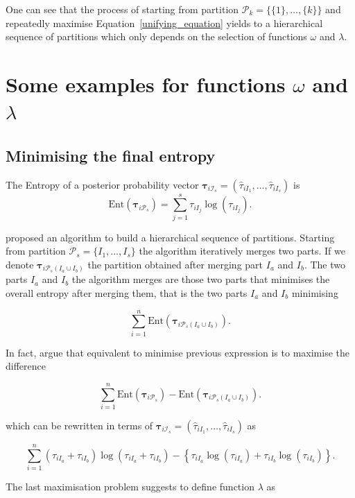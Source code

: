 \documentclass[10pt, a4paper]{article}
\newcommand{\m}[1]{\boldsymbol{#1}}
\begin{document}
\begin{spacing}{1.9}
One can see that the process of starting from partition $\mathcal{P}_k = \{ \{1\}, \dots, \{k\} \}$ and repeatedly maximise Equation~\ref{unifying_equation} yields to a hierarchical sequence of partitions which only depends on the selection of functions $\omega$ and $\lambda$.


\section{Some examples for functions $\omega$ and $\lambda$}

\subsection{Minimising the final entropy}
\label{entropy_section}

The Entropy of a posterior probability vector $\m\tau_{i \mathcal{I}_s} = \left( \hat{\tau}_{i I_1} , \dots, \hat{\tau}_{i I_s}  \right)$ is
\[
\text{Ent}( \m\tau_{i \mathcal{P}_s} ) = \sum_{j=1}^s \tau_{i I_j}  \log(\tau_{i I_j} ).
\]


\cite{baudry2010combining} proposed an algorithm to build a hierarchical sequence of partitions. Starting from partition $\mathcal{P}_s = \{ I_1, \dots, I_s\}$ the algorithm iteratively merges two parts. If we denote $\m\tau_{i \mathcal{P}_s(I_a\cup I_b)}$ the partition obtained after merging part $I_a$ and $I_b$. The two parts $I_a$ and $I_b$ the algorithm merges are those two parts that minimises the overall entropy after merging them, that is the two parts $I_a$ and $I_b$ minimising

\[
\sum_{i=1}^n \text{Ent}( \m\tau_{i \mathcal{P}_s(I_a\cup I_b)} ).
\]


In fact, \cite{baudry2010combining}  argue that equivalent to minimise previous expression is to maximise the difference

\[
\sum_{i=1}^n \text{Ent}( \m\tau_{i \mathcal{P}_s} ) - \text{Ent}( \m\tau_{i \mathcal{P}_s(I_a\cup I_b)} ).
\]

which can be rewritten in terms of $\m\tau_{i \mathcal{I}_s} = \left( \hat{\tau}_{i I_1} , \dots, \hat{\tau}_{i I_s}  \right)$ as

\begin{equation}\label{entropy}
\sum_{i=1}^n  (\tau_{iI_a}+\tau_{iI_b}) \log(\tau_{iI_a} + \tau_{iI_b}) - \left\{ \tau_{iI_a} \log(\tau_{iI_a}) + \tau_{iI_b} \log(\tau_{iI_b}) \right\}.
\end{equation}

The last maximisation problem suggests to define function $\lambda$ as


\end{spacing}
\end{document}
